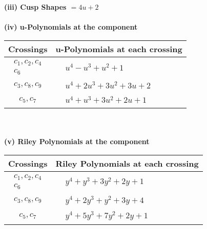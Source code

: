 \documentclass[1p]{elsarticle_modified}
\theoremstyle{definition}
\begin{document}
\flushleft \textbf{(iii) Cusp Shapes $= 4 u+2$}\\~\\
\newpage\renewcommand{\arraystretch}{1}
\flushleft \textbf{(iv) u-Polynomials at the component}\newline \\
\begin{tabular}{m{50pt}|m{274pt}}
Crossings & \hspace{64pt}u-Polynomials at each crossing \\
\hline $$\begin{aligned}c_{1},c_{2},c_{4}\\c_{6}\end{aligned}$$&$\begin{aligned}
&u^4- u^3+u^2+1
\end{aligned}$\\
\hline $$\begin{aligned}c_{3},c_{8},c_{9}\end{aligned}$$&$\begin{aligned}
&u^4+2 u^3+3 u^2+3 u+2
\end{aligned}$\\
\hline $$\begin{aligned}c_{5},c_{7}\end{aligned}$$&$\begin{aligned}
&u^4+u^3+3 u^2+2 u+1
\end{aligned}$\\
\hline
\end{tabular}\\~\\
\newpage\renewcommand{\arraystretch}{1}
\flushleft \textbf{(v) Riley Polynomials at the component}\newline \\
\begin{tabular}{m{50pt}|m{274pt}}
Crossings & \hspace{64pt}Riley Polynomials at each crossing \\
\hline $$\begin{aligned}c_{1},c_{2},c_{4}\\c_{6}\end{aligned}$$&$\begin{aligned}
&y^4+y^3+3 y^2+2 y+1
\end{aligned}$\\
\hline $$\begin{aligned}c_{3},c_{8},c_{9}\end{aligned}$$&$\begin{aligned}
&y^4+2 y^3+y^2+3 y+4
\end{aligned}$\\
\hline $$\begin{aligned}c_{5},c_{7}\end{aligned}$$&$\begin{aligned}
&y^4+5 y^3+7 y^2+2 y+1
\end{aligned}$\\
\hline
\end{tabular}\\~\\
\end{document}
